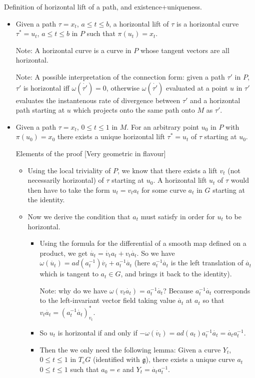 \documentclass{report}
\theoremstyle{definition}
\begin{document}
Definition of horizontal lift of a path, and existence+uniqueness.

\begin{itemize}
    \item Given a path $\tau=x_t$, $a\leq t\leq b$, a horizontal lift of $\tau$ is a horizontal curve $\tau^*=u_t$, $a\leq t\leq b$ in $P$ such that $\pi(u_t)=x_t$.

    Note: A horizontal curve is a curve in $P$ whose tangent vectors are all horizontal.

    Note: A possible interpretation of the connection form: given a path $\tau'$ in $P$, $\tau'$ is horizontal iff $\omega(\dot{\tau'})=0$, otherwise $\omega(\dot{\tau'})$ evaluated at a point $u$ in $\tau'$ evaluates the instantenous rate of divergence between $\tau'$ and a horizontal path starting at $u$ which projects onto the same path onto $M$ as $\tau'$. 
    \item Given a path $\tau=x_t$, $0\leq t\leq 1$ in $M$. For an arbitrary point $u_0$ in $P$ with $\pi(u_0)=x_0$ there exists a unique horizontal lift $\tau^*=u_t$ of $\tau$ starting at $u_0$.

    Elements of the proof [Very geometric in flavour]
    \begin{itemize}
        \item Using the local triviality of $P$, we know that there exists a lift $v_t$ (not necessarily horizontal) of $\tau$ starting at $u_0$. A horizontal lift $u_t$ of $\tau$ would then have to take the form $u_t=v_ta_t$ for some curve $a_t$ in $G$ starting at the identity.
        \item Now we derive the condition that $a_t$ must satisfy in order for $u_t$ to be horizontal.
        \begin{itemize}
            \item Using the formula for the differential of a smooth map defined on a product, we get $\dot{u_t}=\dot{v_t}a_t+v_t\dot{a_t}$. So we have $\omega(\dot{u_t})=ad(a^{-1}_t)\dot{v_t}+a^{-1}_t\dot{a_t}$ (here $a^{-1}_t\dot{a_t}$ is the left translation of $\dot{a_t}$ which is tangent to $a_t\in G$, and brings it back to the identity).

            Note: why do we have $\omega(v_t\dot{a_t})=a^{-1}_t\dot{a_t}$? Because $a^{-1}_t\dot{a_t}$ corresponds to the left-invariant vector field taking value $\dot{a_t}$ at $a_t$ so that $v_t\dot{a_t}=(a^{-1}_t\dot{a_t})^*_{v_t}$.
            \item So $u_t$ is horizontal if and only if $-\omega(\dot{v_t})=ad(a_t)a^{-1}_t\dot{a_t}=\dot{a_t}a^{-1}_t$.
            \item Then the we only need the following lemma: Given a curve $Y_t$, $0\leq t\leq 1$ in $T_eG$ (identified with $\mathfrak{g}$), there exists a unique curve $a_t$ $0\leq t\leq 1$ such that $a_0=e$ and $Y_t=\dot{a_t}a^{-1}_t$.
        \end{itemize}
    \end{itemize}
\end{itemize}
\end{document}
